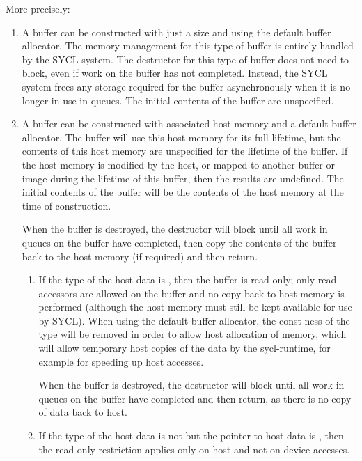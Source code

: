 More precisely:
\begin{enumerate}
  \item
    A buffer can be constructed with just a size and using the default
    buffer allocator.  The memory management for this type of buffer
    is entirely handled by the SYCL system. The destructor for this
    type of buffer does not need to block, even if work on the buffer has not
    completed. Instead, the SYCL system frees any storage required
    for the buffer asynchronously when it is no longer in use in queues.
    The initial contents of the buffer are unspecified.

  \item
    A buffer can be constructed with associated host memory and a default
    buffer allocator. The buffer will use this host memory for its full lifetime, but the
    contents of this host memory are unspecified for the lifetime of the
    buffer. If the host memory is modified by the host, or mapped to
    another buffer or image during the lifetime of this buffer, then
    the results are undefined. The initial contents of the buffer will
    be the contents of the host memory at the time of construction.

    When the buffer is destroyed, the destructor will block until all
    work in queues on the buffer have completed, then copy the contents
    of the buffer back to the host memory (if required) and then
    return.

    \begin{enumerate}
    \item
    If the type of the host data is , then the buffer is
    read-only; only read accessors are allowed on the buffer and
    no-copy-back to host memory is performed (although the host memory
    must still be kept available for use by SYCL). When using the default
    buffer allocator, the const-ness of the type will be removed in order to
    allow host allocation of memory, which will allow temporary host copies
    of the data by the \gls{sycl-runtime}, for example for speeding up
    host accesses.

    When the buffer is destroyed, the destructor will block until all
    work in queues on the buffer have completed and then return, as there
    is no copy of data back to host.

    \item

      If the type of the host data is not  but the
      pointer to host data is , then the read-only
      restriction applies only on host and not on device accesses.


\end{enumerate}
\end{enumerate}

